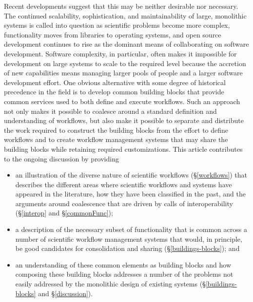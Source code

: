 Recent developments suggest that this may be neither desirable nor necessary.
The continued scalability, sophistication, and maintainability of large, monolithic systems is called into question as scientific problems become more complex, functionality moves from libraries to operating systems, and open source development continues to rise as the dominant means of collaborating on software development. Software complexity, in particular, often makes it
impossible for development on large systems to scale to the required level 
because the accretion of new capabilities means managing larger pools of
people and a larger software development effort. One obvious alternative with
some degree of historical precedence in the field is to develop common
building blocks that provide common services used to both define and execute
workflows. Such an approach not only makes it possible to coalesce around a
standard definition and understanding of workflows, but also make it possible to separate and
distribute the work required to construct the building blocks from the effort to
define workflows and to create workflow management systems that may share the
building blocks while retaining required customizations. This article
contributes to the ongoing discussion by providing
\begin{itemize}
\item an illustration of the diverse nature of
scientific workflows (\S \ref{workflows}) that describes the different
areas where scientific workflows and systems have appeared in the literature,
how they have been classified in the past, and the arguments around coalescence
that are driven by calls of interoperability (\S\ref{interop} and \S\ref{commonFunc});
\item a description of the necessary
subset of functionality that is common across a number of scientific workflow
management systems that would, in principle, be good candidates for
consolidation and sharing (\S \ref{buildings-blocks}); and
\item an understanding of
these common elements as building blocks and how composing these building blocks
addresses a number of the problems not easily addressed by the monolithic design
of existing systems (\S\ref{buildings-blocks} and \S\ref{discussion}).
\end{itemize}

